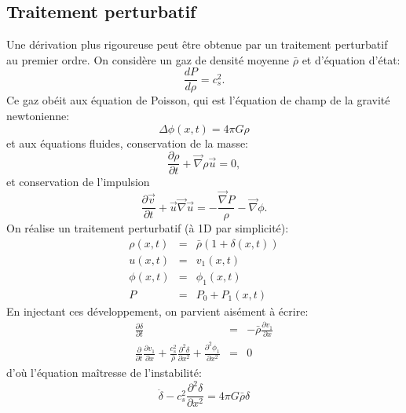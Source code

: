 \subsection{Traitement perturbatif}
Une dérivation plus rigoureuse peut être obtenue par un traitement perturbatif au premier ordre. On considère un gaz de densité moyenne $\bar \rho$ et d'équation d'état:
\begin{equation}
\frac{dP}{d\rho}=c_s^2.
\end{equation}
Ce gaz obéit aux équation de Poisson, qui est l'équation de champ de la gravité newtonienne:
\begin{equation}
\Delta \phi(x,t) = 4 \pi G \rho
\end{equation}
 et aux équations fluides, conservation de la masse:
 \begin{equation}
 \frac{\partial \rho}{\partial t} + \vec \nabla \rho \vec u=0,
 \end{equation}
 et conservation de l'impulsion
 \begin{equation}
 \frac{\partial \vec v}{\partial t} +\vec u \vec \nabla \vec u = -\frac{\vec \nabla P}{\rho}-\vec \nabla \phi.
 \end{equation}
 On réalise un traitement perturbatif (à 1D par simplicité):
 \begin{eqnarray}
 \rho(x,t)&=&\bar \rho(1 +\delta(x,t))\\
 u(x,t)&=&v_1(x,t)\\
 \phi(x,t)&=&\phi_1(x,t)\\
 P&=&P_0+P_1(x,t)
 \end{eqnarray}
 En injectant ces développement, on parvient aisément à écrire:
 \begin{eqnarray}
 \frac{\partial \delta}{\partial t}&=&-\bar \rho \frac{\partial v_1}{\partial x}\\
 \frac{\partial}{\partial t}\frac{\partial v_1}{\partial x}+\frac{c_s^2}{\bar \rho}\frac{\partial^2 \delta}{\partial x^2}+\frac{\partial^2 \phi_1}{\partial x^2}&=&0
 \end{eqnarray}
 d'où l'équation maîtresse de l'instabilité:
 \begin{equation}
 \ddot \delta -c_s ^2\frac{\partial^2 \delta}{\partial x^2}=4\pi G \bar \rho \delta
 \end{equation}

